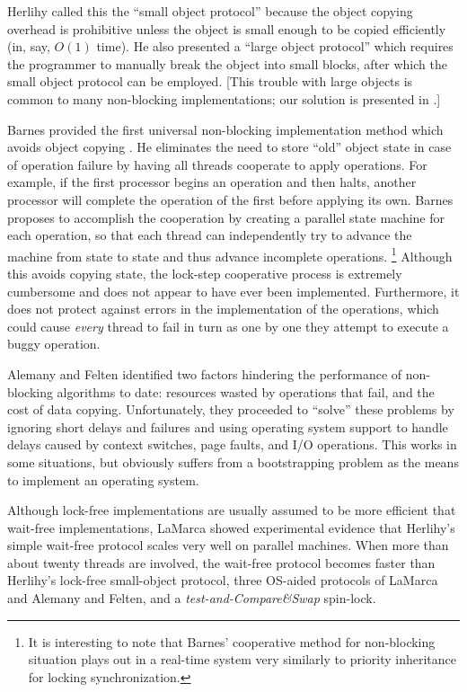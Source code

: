 Herlihy called this the ``small object protocol'' because the object
copying overhead is prohibitive unless the object is small enough to
be copied efficiently (in, say, $O(1)$ time).  He also presented a
``large object protocol'' which requires the programmer to
manually break the object into small blocks, after which the small
object protocol can be employed. 
[This trouble with large objects is
common to many non-blocking implementations; our solution is presented
in .]

Barnes provided the first universal non-blocking implementation
method which avoids object copying \cite{Barnes93}.  He eliminates the
need to store ``old'' object
state in case of operation failure by having all threads cooperate to
apply operations.  For example, if the first processor begins an operation
and then halts, another processor will complete the operation of the first
before applying its own.  Barnes proposes to accomplish the
cooperation by creating a parallel state machine for each operation,
so that each thread can independently try to advance the machine from state
to state and thus advance incomplete operations.%
\footnote{It is interesting to note that Barnes' cooperative method
  for non-blocking 
  situation plays out in a real-time system very similarly to priority
  inheritance for locking synchronization.}
Although this avoids
copying state, the lock-step cooperative process is extremely
cumbersome and does not appear to have ever been implemented.
Furthermore, it does not protect against errors in the implementation
of the operations, which could cause \emph{every} thread to fail in turn
as one by one they attempt to execute a buggy operation.

Alemany and Felten \cite{AlemanyFe92} identified two factors hindering the
performance of non-blocking algorithms to date: resources wasted by operations
that fail, and the cost of data copying.  Unfortunately, they
proceeded to
``solve'' these problems by ignoring short delays and failures and
using operating system support to handle delays caused by
context switches, page faults, and
I/O operations.  This works in some situations, but obviously suffers
from a bootstrapping problem as the means to implement an operating system.

Although lock-free implementations are usually assumed to be more
efficient that wait-free implementations, LaMarca \cite{LaMarca94}
showed experimental evidence that Herlihy's simple
wait-free protocol scales very well on parallel machines.
When more than about twenty threads are involved, the wait-free
protocol becomes
faster than Herlihy's lock-free small-object protocol, three OS-aided
protocols of LaMarca and Alemany and Felten, and a
\emph{test-and-Compare\&Swap} spin-lock.

